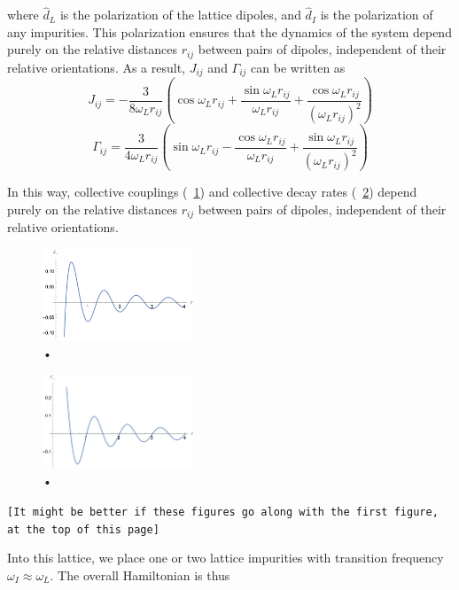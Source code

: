 \documentclass[aps,pra,superscriptaddress,twocolumn]{revtex4-1}
\newcommand{\fref}[1]{\text{Fig.}~\ref{#1}}
\newcommand{\commentSB}[1]{\texttt{\color{blue}[#1]}}
\begin{document}
where $\hat{d}_L$ is the polarization of the lattice dipoles, and $\hat{d}_I$ is the polarization of any impurities. This polarization ensures that the dynamics of the system depend purely on the relative distances $r_{ij}$ between pairs of dipoles, independent of their relative orientations. As a result, $J_{ij}$ and $\Gamma_{ij}$ can be written as 
\begin{equation} J_{ij} = -\frac{3}{8 \omega_L r_{ij}} \left( \cos \omega_L r_{ij} + \frac{\sin \omega_L r_{ij}}{\omega_L r_{ij}} + \frac{\cos \omega_L r_{ij}}{(\omega_L r_{ij})^2} \right) \end{equation}
\begin{equation} \Gamma_{ij} = \frac{3}{4\omega_L r_{ij}} \left( \sin\omega_L r_{ij} - \frac{\cos\omega_L r_{ij}}{\omega_L r_{ij}} + \frac{\sin\omega_L r_{ij}}{(\omega_L r_{ij})^2} \right) \end{equation}

In this way, collective couplings (\fref{fig:J_r}) and collective decay rates (\fref{fig:Gamma_r}) depend purely on the relative distances $r_{ij}$ between pairs of dipoles, independent of their relative orientations. 
\begin{figure}
    \includegraphics[width=0.4\textwidth]{figures/J(r).png} 
    \caption{•}
    \label{fig:J_r}
\end{figure}

\begin{figure}
    \includegraphics[width=0.4\textwidth]{figures/Gamma(r).png} 
    \caption{•}
    \label{fig:Gamma_r}
\end{figure}

\commentSB{It might be better if these figures go along with the first figure, at the top of this page}

Into this lattice, we place one or two lattice impurities with transition frequency $\omega_I \approx \omega_L$. The overall Hamiltonian is thus 
\end{document}
